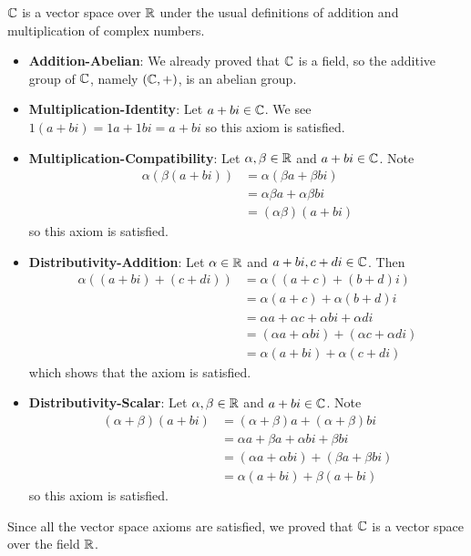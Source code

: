 \begin{example}
    $\mathbb{C}$ is a vector space over $\mathbb{R}$ under the usual definitions of addition and multiplication of complex numbers.
    \begin{itemize}
        \item \textbf{Addition-Abelian}: We already proved that $\mathbb{C}$ is a field, so the additive group of $\mathbb{C}$, namely $(\mathbb{C}, +)$, is an abelian group.
        
        \item \textbf{Multiplication-Identity}: Let $a + bi \in \mathbb{C}$. We see $1(a+bi) = 1a + 1bi = a + bi$ so this axiom is satisfied.

        \item \textbf{Multiplication-Compatibility}: Let $\alpha, \beta \in \mathbb{R}$ and $a + bi \in \mathbb{C}$. Note
        \begin{align*}
            \alpha(\beta(a+bi)) &= \alpha(\beta a + \beta bi)\\
            &= \alpha\beta a + \alpha\beta bi\\
            &= (\alpha\beta)(a+bi)
        \end{align*}
        so this axiom is satisfied.
        
        \item \textbf{Distributivity-Addition}: Let $\alpha \in \mathbb{R}$ and $a + bi, c + di \in \mathbb{C}$. Then
        \begin{align*}
            \alpha((a+bi) + (c+di)) &= \alpha((a+c) + (b+d)i)\\
            &= \alpha(a+c) + \alpha(b+d)i\\
            &= \alpha a + \alpha c + \alpha bi + \alpha di\\
            &= (\alpha a + \alpha bi) + (\alpha c + \alpha di)\\
            &= \alpha (a+bi) + \alpha (c+di)
        \end{align*}
        which shows that the axiom is satisfied.
        
        \item \textbf{Distributivity-Scalar}: Let $\alpha, \beta \in \mathbb{R}$ and $a + bi \in \mathbb{C}$. Note
        \begin{align*}
            (\alpha+\beta)(a+bi) &= (\alpha+\beta)a + (\alpha+\beta)bi\\
            &= \alpha a + \beta a + \alpha bi + \beta bi\\
            &= (\alpha a + \alpha bi) + (\beta a + \beta bi)\\
            &= \alpha(a+bi) + \beta(a+bi)
        \end{align*}
        so this axiom is satisfied.
    \end{itemize}
    
    Since all the vector space axioms are satisfied, we proved that $\mathbb{C}$ is a vector space over the field $\mathbb{R}$.
\end{example}

